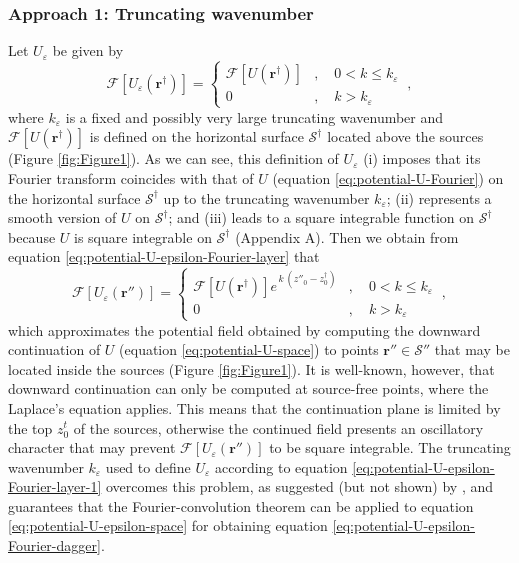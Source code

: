 \subsubsection{Approach 1: Truncating wavenumber}

Let $U_{\varepsilon}$ be given by
\begin{equation}
	\mathcal{F} [ U_{\varepsilon}(\mathbf{r}^{\dagger}) ] = 
	\begin{cases}
		\mathcal{F} [ U(\mathbf{r}^{\dagger}) ] &
		, \quad 0 < k \le k_{\varepsilon} \\
		0 & , \quad k > k_{\varepsilon} 
	\end{cases} \: ,
	\label{eq:potential-U-epsilon-Fourier-dagger-1}
\end{equation}
where $k_{\varepsilon}$ is a fixed and possibly very large truncating wavenumber and 
$\mathcal{F} \left[ U(\mathbf{r}^{\dagger}) \right]$ is defined on the horizontal surface $\mathcal{S}^{\dagger}$ 
located above the sources (Figure \ref{fig:Figure1}). 
As we can see, this definition of $U_{\varepsilon}$ 
(i) imposes that its Fourier transform coincides with 
that of $U$ (equation \ref{eq:potential-U-Fourier}) on the horizontal surface $\mathcal{S}^{\dagger}$ 
up to the truncating wavenumber $k_{\varepsilon}$; 
(ii) represents a smooth version of $U$ on $\mathcal{S}^{\dagger}$; and
(iii) leads to a square integrable function on $\mathcal{S}^{\dagger}$ because 
$U$ is square integrable on $\mathcal{S}^{\dagger}$ (Appendix A).
Then we obtain from equation \ref{eq:potential-U-epsilon-Fourier-layer} that 
\begin{equation}
	\mathcal{F} \left[ U_{\varepsilon}(\mathbf{r}'') \right] = 
	\begin{cases}
		\mathcal{F} \left[ U(\mathbf{r}^{\dagger}) \right] 
		e^{\, k \, (z''_{0} - z^{\dagger}_{0})} & , 
		\quad 0 < k \le k_{\varepsilon} \\
		0 & , \quad k > k_{\varepsilon} 
	\end{cases} \: ,
	\label{eq:potential-U-epsilon-Fourier-layer-1}
\end{equation}
which approximates the potential field obtained by 
computing the downward continuation of $U$ (equation \ref{eq:potential-U-space}) 
to points $\mathbf{r}'' \in \mathcal{S}''$ that may be located inside the sources (Figure \ref{fig:Figure1}). 
It is well-known, however, that downward continuation can only be computed at 
source-free points, where the Laplace's equation applies. This means that the
continuation plane is limited by the top $z^{t}_{0}$ of the sources, otherwise the continued field 
presents an oscillatory character \citep[e.g.,][]{roy1967, fedi_florio2002} that may
prevent $\mathcal{F} \left[ U_{\varepsilon}(\mathbf{r}'') \right]$ to be square integrable.
The truncating wavenumber $k_{\varepsilon}$ used to define $U_{\varepsilon}$ according to equation 
\ref{eq:potential-U-epsilon-Fourier-layer-1} overcomes this problem, as suggested (but not shown) 
by \citet{bhattacharyya1967},
and guarantees that the Fourier-convolution theorem can be applied to equation \ref{eq:potential-U-epsilon-space} 
for obtaining equation \ref{eq:potential-U-epsilon-Fourier-dagger}.

